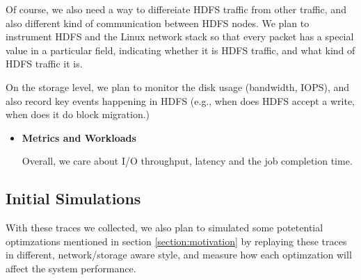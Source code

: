 Of course, we also need a way to differeiate HDFS traffic from other traffic, and also different kind of communication between HDFS nodes. We plan to instrument HDFS and the Linux network stack so that every packet has a special value in a particular field, indicating whether it is HDFS traffic, and what kind of HDFS traffic it is.

On the storage level, we plan to monitor the disk usage (bandwidth, IOPS), and also record key events happening in HDFS (e.g., when does HDFS accept a write, when does it do block migration.) 


\begin{itemize}
	\item {\bf Metrics and Workloads}

Overall, we care about I/O throughput, latency and the job completion time. 

	

\end{itemize}

\subsection{\bf Initial Simulations}
With these traces we collected, we also plan to simulated some potetential optimzations mentioned in section \ref{section:motivation} by replaying these traces in different, network/storage aware style, and measure how each optimzation will affect the system performance.



